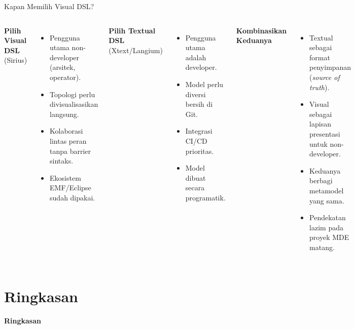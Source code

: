 \documentclass[aspectratio=169, table]{beamer}
\begin{document}
\begin{frame}{Kapan Memilih Visual DSL?}
\vspace{10pt}
\begin{columns}[T]
\textbf{Pilih Visual DSL}\\(Sirius)
\begin{itemize}
  \item Pengguna utama non-developer (arsitek, operator).
  \item Topologi perlu divisualisasikan langsung.
  \item Kolaborasi lintas peran tanpa barrier sintaks.
  \item Ekosistem EMF/Eclipse sudah dipakai.
\end{itemize}

\textbf{Pilih Textual DSL}\\(Xtext/Langium)
\begin{itemize}
  \item Pengguna utama adalah developer.
  \item Model perlu diversi bersih di Git.
  \item Integrasi CI/CD prioritas.
  \item Model dibuat secara programatik.
\end{itemize}

\textbf{Kombinasikan Keduanya}
\begin{itemize}
  \item Textual sebagai format penyimpanan (\textit{source of truth}).
  \item Visual sebagai lapisan presentasi untuk non-developer.
  \item Keduanya berbagi metamodel yang sama.
  \item Pendekatan lazim pada proyek MDE matang.
\end{itemize}
\end{columns}
\end{frame}

\section{Ringkasan}
\begin{frame}{\hfill}
	\centering
	\Huge{\textbf{Ringkasan}}
\end{frame}
\end{document}
